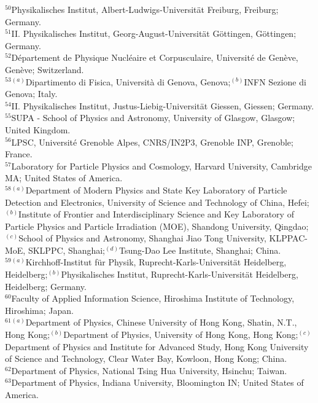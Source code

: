 \begin{flushleft}
$^{50}$Physikalisches Institut, Albert-Ludwigs-Universit\"{a}t Freiburg, Freiburg; Germany.\\
$^{51}$II. Physikalisches Institut, Georg-August-Universit\"{a}t G\"ottingen, G\"ottingen; Germany.\\
$^{52}$D\'epartement de Physique Nucl\'eaire et Corpusculaire, Universit\'e de Gen\`eve, Gen\`eve; Switzerland.\\
$^{53}$$^{(a)}$Dipartimento di Fisica, Universit\`a di Genova, Genova;$^{(b)}$INFN Sezione di Genova; Italy.\\
$^{54}$II. Physikalisches Institut, Justus-Liebig-Universit{\"a}t Giessen, Giessen; Germany.\\
$^{55}$SUPA - School of Physics and Astronomy, University of Glasgow, Glasgow; United Kingdom.\\
$^{56}$LPSC, Universit\'e Grenoble Alpes, CNRS/IN2P3, Grenoble INP, Grenoble; France.\\
$^{57}$Laboratory for Particle Physics and Cosmology, Harvard University, Cambridge MA; United States of America.\\
$^{58}$$^{(a)}$Department of Modern Physics and State Key Laboratory of Particle Detection and Electronics, University of Science and Technology of China, Hefei;$^{(b)}$Institute of Frontier and Interdisciplinary Science and Key Laboratory of Particle Physics and Particle Irradiation (MOE), Shandong University, Qingdao;$^{(c)}$School of Physics and Astronomy, Shanghai Jiao Tong University, KLPPAC-MoE, SKLPPC, Shanghai;$^{(d)}$Tsung-Dao Lee Institute, Shanghai; China.\\
$^{59}$$^{(a)}$Kirchhoff-Institut f\"{u}r Physik, Ruprecht-Karls-Universit\"{a}t Heidelberg, Heidelberg;$^{(b)}$Physikalisches Institut, Ruprecht-Karls-Universit\"{a}t Heidelberg, Heidelberg; Germany.\\
$^{60}$Faculty of Applied Information Science, Hiroshima Institute of Technology, Hiroshima; Japan.\\
$^{61}$$^{(a)}$Department of Physics, Chinese University of Hong Kong, Shatin, N.T., Hong Kong;$^{(b)}$Department of Physics, University of Hong Kong, Hong Kong;$^{(c)}$Department of Physics and Institute for Advanced Study, Hong Kong University of Science and Technology, Clear Water Bay, Kowloon, Hong Kong; China.\\
$^{62}$Department of Physics, National Tsing Hua University, Hsinchu; Taiwan.\\
$^{63}$Department of Physics, Indiana University, Bloomington IN; United States of America.\\

\end{flushleft}
